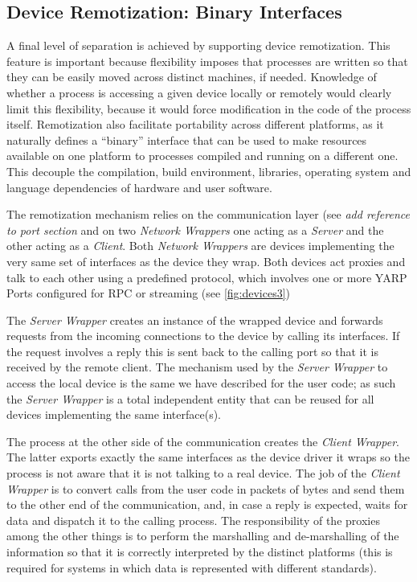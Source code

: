 \subsection{Device Remotization: Binary Interfaces}
A final level of separation is achieved by supporting device remotization. 
This feature is important because flexibility imposes 
that processes are written so that they can be easily moved across 
distinct machines, if needed. Knowledge of whether a process is accessing 
a given device locally or remotely would clearly limit this flexibility, 
because it would force modification in the code of the process itself. 
Remotization also facilitate portability across different platforms, as 
it naturally defines a ``binary'' interface that can 
be used to make resources available on one platform to processes compiled 
and running on a different one. This decouple the compilation, build 
environment, libraries, operating system and language dependencies of 
hardware and user software.

The remotization mechanism relies on the communication layer (see \emph{add 
reference to port section} and on two \emph{Network Wrappers} one acting 
as a \emph{Server} and the other acting as a \emph{Client}. 
Both \emph{Network Wrappers} are devices implementing the very same set 
of interfaces as the device they wrap. Both devices act proxies and talk 
to each other using a predefined protocol, which involves one or more 
YARP Ports configured for RPC or streaming (see \ref{fig:devices3})

The \emph{Server Wrapper} creates an instance of the wrapped device and 
forwards requests from the incoming connections to the device by calling 
its interfaces. If the request involves a reply this is sent back to the 
calling port so that it is received by the remote client. The mechanism 
used by the \emph{Server Wrapper} to access the local device is the same 
we have described for the user code; as 
such the \emph{Server Wrapper} is a total independent entity that can be 
reused for all devices implementing the same interface(s). 

The process at the other side of the communication creates the 
\emph{Client Wrapper}. The latter exports exactly the same interfaces as the 
device driver it wraps so the process is not aware that it is not talking to 
a real device. The job of the \emph{Client Wrapper} is to convert calls from 
the user code in packets of bytes and send them to the other end of the 
communication, and, in case a reply is expected, waits for data and dispatch 
it to the calling process. The responsibility of the proxies among the other 
things is to perform the marshalling and de-marshalling of the information 
so that it is correctly interpreted by the distinct platforms (this is 
required for systems in which data is represented with different standards).

